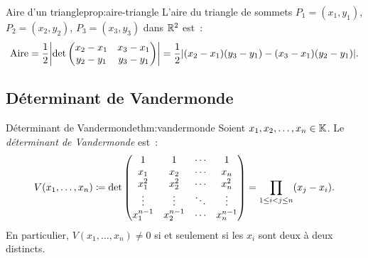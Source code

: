 \begin{proposition}{Aire d'un triangle}{prop:aire-triangle}
  L'aire du triangle de sommets $P_1=(x_1,y_1)$, $P_2=(x_2,y_2)$,
  $P_3=(x_3,y_3)$ dans ${\mathbb{R}}^2$ est~:
  \[
    \text{Aire}=\frac{1}{2}\abs*{\det\begin{pmatrix}
    x_2-x_1&x_3-x_1\\y_2-y_1&y_3-y_1\end{pmatrix}}
    =\frac{1}{2}\abs{(x_2-x_1)(y_3-y_1)-(x_3-x_1)(y_2-y_1)}.
  \]
\end{proposition}

\subsection{Déterminant de Vandermonde}\label{subsec:vandermonde}

\begin{theorem}{Déterminant de Vandermonde}{thm:vandermonde}
  Soient $x_1,x_2,\ldots,x_n\in{\mathbb{K}}$. Le
  \emph{déterminant de Vandermonde} est~:
  \[
    V(x_1,\ldots,x_n)\coloneqq
    \det\begin{pmatrix}
    1&1&\cdots&1\\
    x_1&x_2&\cdots&x_n\\
    x_1^2&x_2^2&\cdots&x_n^2\\
    \vdots&\vdots&\ddots&\vdots\\
    x_1^{n-1}&x_2^{n-1}&\cdots&x_n^{n-1}
    \end{pmatrix}
    =\prod_{1\leq i<j\leq n}(x_j-x_i).
  \]
  En particulier, $V(x_1,\ldots,x_n)\neq 0$ si et seulement si les
  $x_i$ sont deux à deux distincts.
\end{theorem}


